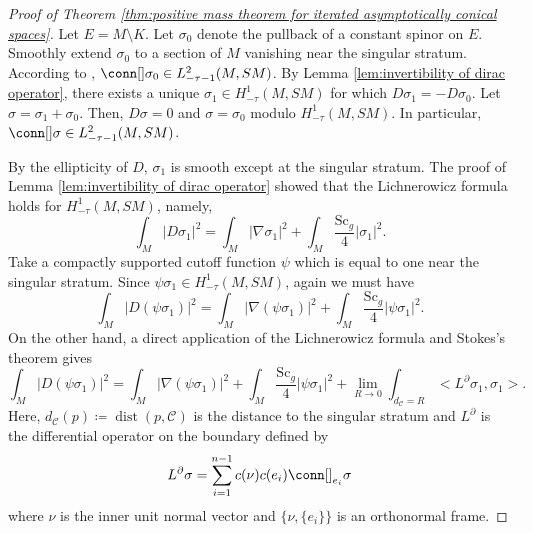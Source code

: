 \documentclass[12pt, reqno]{amsart}
\theoremstyle{plain} %
\theoremstyle{definition}
\theoremstyle{remark}
\numberwithin{equation}{section}
\newcommand{\pnorm}[1]{| #1 |}
\newcommand{\cat}[1]{\mathcal{#1}}
\newcommand{\Sc}{\mathrm{Sc}}
\DeclareMathOperator{\dist}{dist}
\begin{document}
\begin{proof}[Proof of Theorem \ref{thm:positive mass theorem for iterated asymptotically conical spaces}]
    Let \(E = M \setminus K\).
    Let \(\sigma_0\) denote the pullback of a constant spinor on \(E\).
    Smoothly extend \(\sigma_0\) to a section of \(M\) vanishing near the singular stratum.
    According to \cite{Bartnik:1986}, \(\conn[] \sigma_0 \in L_{-\tau-1}^2(M, SM)\).
    By Lemma \ref{lem:invertibility of dirac operator}, there exists a unique \(\sigma_1 \in H_{-\tau}^1(M, SM)\) for which \(D\sigma_1 = -D\sigma_0\).
    Let \(\sigma = \sigma_1 + \sigma_0\).
    Then, \(D\sigma = 0\) and \(\sigma = \sigma_0\) modulo \(H_{-\tau}^1(M, SM)\).
    In particular, \(\conn[] \sigma \in L_{-\tau-1}^2(M, SM)\).

    By the ellipticity of \(D\), \(\sigma_1\) is smooth except at the singular stratum.
    The proof of Lemma \ref{lem:invertibility of dirac operator} showed that the Lichnerowicz formula holds for \(H_{-\tau}^1(M, SM)\), namely,
    \begin{equation}\label{eqn:lichnerowicz formula for H1_tau section}
        \int_M \pnorm{D\sigma_1}^2 = \int_M \pnorm{\nabla \sigma_1}^2 + \int_M \frac{\Sc_g}{4}\pnorm{\sigma_1}^2.
    \end{equation}
    Take a compactly supported cutoff function \(\psi\) which is equal to one near the singular stratum.
    Since \(\psi \sigma_1 \in H_{-\tau}^1(M, SM)\), again we must have
    \begin{equation*}
        \int_M \pnorm{D (\psi \sigma_1)}^2 = \int_M \pnorm{\nabla (\psi \sigma_1)}^2 + \int_M \frac{\Sc_g}{4}\pnorm{\psi \sigma_1}^2.
    \end{equation*}
    On the other hand, a direct application of the Lichnerowicz formula and Stokes's theorem gives
    \begin{equation*}
        \int_M \pnorm{D (\psi \sigma_1)}^2 = \int_M \pnorm{\nabla (\psi \sigma_1)}^2 + \int_M \frac{\Sc_g}{4}\pnorm{\psi \sigma_1}^2 + \lim_{R \to 0} \int_{d_\cat{C}=R} \big< L^\partial \sigma_1, \sigma_1 \big>.
    \end{equation*}
    Here, \(d_\cat{C}(p) \coloneqq \dist(p, \cat{C})\) is the distance to the singular stratum and \(L^\partial\) is the differential operator on the boundary defined by
    \begin{equation*}
        L^\partial \sigma = \sum_{i=1}^{n-1} c(\nu)c(e_i)\conn[]_{e_i} \sigma
    \end{equation*}
    where \(\nu\) is the inner unit normal vector and \(\{\nu, \{e_i\}\}\) is an orthonormal frame.

\end{proof}
\end{document}
